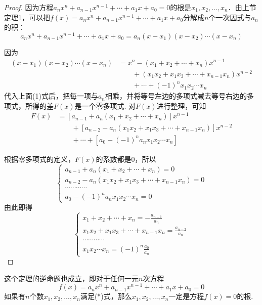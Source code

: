 \begin{proof}
因为方程$a_nx^n+a_{n-1}x^{n-1}+\cdots +a_1x+a_0=0$的根是$x_1,x_2,\ldots ,x_n$．由上节定理1，可以把$f(x)=a_nx^n+a_{n-1}x^{n-1}+\cdots +a_1x+a_0$分解成$n$个一次因式与$a_n$的积：
\begin{equation}
    a_nx^n+a_{n-1}x^{n-1}+\cdots +a_1x+a_0=a_n(x-x_1)(x-x_2)\cdots (x-x_n) \tag{1}
\end{equation}

因为
\[\begin{split}
    (x-x_1)(x-x_2)\cdots (x-x_n) &=x^n-(x_1+x_2+\cdots +x_n)x^{n-1}\\
    &\qquad +(x_1x_2+x_1x_3+\cdots +x_{n-1}x_n)x^{n-2}\\
    &\qquad +\cdots +(-1)^n x_1x_2\cdots x_n
\end{split}\]
代入上面(1)式后，把每一项与$a_n$相乘，并将等号左边的多项式减去等号右边的多项式，所得的差$F(x)$是一个零多项式. 对$F(x)$进行整理，可知
\[\begin{split}
  F(x)&=[a_{n-1}+a_n(x_1+x_2+\cdots +x_n)]x^{n-1}\\
  &\qquad +\left[a_{n-2}-a_n(x_1x_2+x_1x_3+\cdots +x_{n-1}x_n)\right]x^{n-2}\\
  &\qquad +\cdots +\left[a_0-(-1)^n a_n x_1x_2\cdots x_n\right]
\end{split}\]

根据零多项式的定义，$F(x)$的系数都是0，所以   
\[\begin{cases}
    a_{n-1}+a_n(x_1+x_2+\cdots +x_n)=0\\
    a_{n-2}-a_n(x_1x_2+x_1x_3+\cdots +x_{n-1}x_n)=0\\
    \cdots \cdots \cdots \cdots \\
    a_0-(-1)^n a_n x_1x_2\cdots x_n=0
\end{cases}\]
由此即得
\[\begin{cases}
    x_1+x_2+\cdots +x_n=-\frac{a_{n-1}}{a_n}\\
   x_1x_2+x_1x_3+\cdots +x_{n-1}x_n=\frac{a_{n-2}}{a_n}\\
   \cdots \cdots \cdots \cdots \\
    x_1x_2\cdots x_n=(-1)^n \frac{a_{0}}{a_n}
\end{cases}\]
\end{proof}

这个定理的逆命题也成立，即对于任何一元$n$次方程
\begin{equation}
f(x)=a_nx^n+a_{n-1}x^{n-1}+\cdots +a_1x+a_0=0 \tag{*}
\end{equation}
如果有$n$个数$x_1,x_2,\ldots,x_n$满足(*)式，那么$x_1,x_2,\ldots,x_n$一定是方程$f(x)=0$的根.

